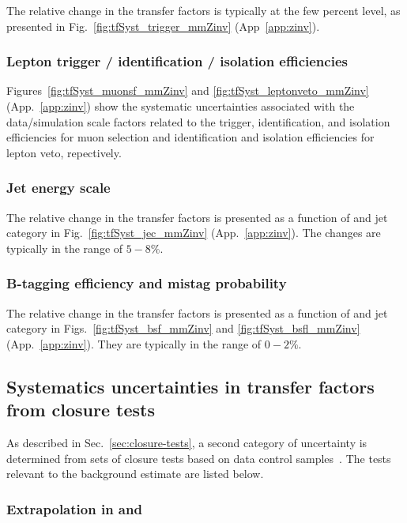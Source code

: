 The relative change in the transfer factors is typically at the few
percent level, as presented in Fig.~\ref{fig:tfSyst_trigger_mmZinv}
(App~\ref{app:zinv}).

\subsubsection{Lepton trigger / identification / isolation efficiencies}
\label{sec:leptonSyst-zinv}

Figures~\ref{fig:tfSyst_muonsf_mmZinv} and
\ref{fig:tfSyst_leptonveto_mmZinv} (App.~\ref{app:zinv}) show the
systematic uncertainties associated with the data/simulation scale
factors related to the trigger, identification, and isolation
efficiencies for muon selection and identification and isolation
efficiencies for lepton veto, repectively.

\subsubsection{Jet energy scale}
\label{sec:tfSyst_jec-zinv}

The relative change in the transfer factors is presented as a function
of \scalht and jet category in Fig.~\ref{fig:tfSyst_jec_mmZinv}
(App.~\ref{app:zinv}). The changes are typically in the range of
$5-8\%$.

\subsubsection{B-tagging efficiency and mistag probability}
\label{sec:tfSyst_btag-zinv}

The relative change in the transfer factors is presented as a function
of \scalht and jet category in Figs.~\ref{fig:tfSyst_bsf_mmZinv} and
\ref{fig:tfSyst_bsfl_mmZinv} (App.~\ref{app:zinv}).  They are
typically in the range of $0-2\%$.

\subsection{Systematics uncertainties in transfer factors from closure tests}
\label{sec:closure-tests-zinv}

As described in Sec.~\ref{sec:closure-tests}, a second category of
uncertainty is determined from sets of closure tests based on data
control samples~\cite{RA1Paper2012}. The tests relevant to the \znunuj
background estimate are listed below. 

\subsubsection{Extrapolation in \texorpdfstring{\alphat}{AlphaT} and
  \texorpdfstring{\bdphi}{biased dPhi}}
\label{sec:tfSyst_alphaT-zinv}


